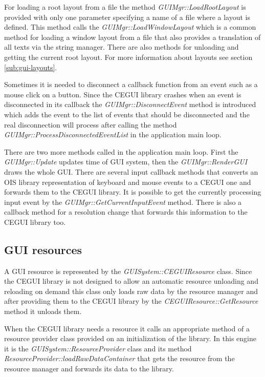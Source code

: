 For loading a root layout from a file the method \emph{GUIMgr::LoadRootLayout} is provided with only one parameter specifying a name of a file where a layout is defined. This method calls the \emph{GUIMgr::LoadWindowLayout} which is a common method for loading a window layout from a file that also provides a translation of all texts via the string manager. There are also methods for unloading and getting the current root layout. For more information about layouts see section \ref{sub:gui-layouts}.

Sometimes it is needed to disconnect a callback function from an event such as a mouse click on a button. Since the CEGUI library crashes when an event is disconnected in its callback the \emph{GUIMgr::DisconnectEvent} method is introduced which adds the event to the list of events that should be disconnected and the real disconnection will process after calling the method \emph{GUIMgr::ProcessDisconnectedEventList} in the application main loop.

There are two more methods called in the application main loop. First the \emph{GUIMgr::Update} updates time of GUI system, then the \emph{GUIMgr::Render\-GUI} draws the whole GUI. There are several input callback methods that converts an OIS library representation of keyboard and mouse events to a CEGUI one and forwards them to the CEGUI library. It is possible to get the currently processing input event by the \emph{GUIMgr::GetCurrentInputEvent} method. There is also a callback method for a resolution change that forwards this information to the CEGUI library too.

\subsection{GUI resources}
\label{sub:gui-resources}

A GUI resource is represented by the \emph{GUISystem::CEGUIResource} class. Since the CEGUI library is not designed to allow an automatic resource unloading and reloading on demand this class only loads raw data by the resource manager and after providing them to the CEGUI library by the \emph{CEGUIResource::GetResource} method it unloads them.

When the CEGUI library needs a resource it calls an appropriate method of a resource provider class provided on an initialization of the library. In this engine it is the \emph{GUISystem::ResourceProvider} class and its method \emph{ResourceProvider::loadRawDataContainer} that gets the resource from the resource manager and forwards its data to the library.

